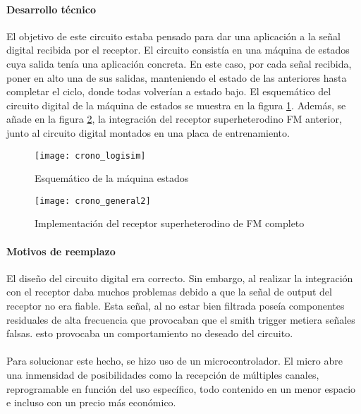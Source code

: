 \paragraph{Desarrollo técnico}
El objetivo de este circuito estaba pensado para dar una aplicaci\'on a la señal digital recibida por el receptor. El circuito consistía en una máquina de estados cuya salida tenía una aplicación concreta. En este caso, por cada señal recibida, poner en alto una de sus salidas, manteniendo el estado de las anteriores hasta completar el ciclo, donde todas volverían a estado bajo. 
El esquemático del circuito digital de la máquina de estados se muestra en la figura \ref{fig:crono_logisim}.
Además, se añade en la figura \ref{fig:crono_general}, la integración del receptor superheterodino FM anterior, junto al circuito digital montados en una placa de entrenamiento.

\begin{figure}[h!]
    \centering
    \texttt{[image: crono\_logisim]}
    \caption{Esquemático de la m\'aquina estados}
    \label{fig:crono_logisim}
\end{figure}

\begin{figure}[h!]
    \centering
    \texttt{[image: crono\_general2]}
    \caption{Implementaci\'on del receptor superheterodino de FM completo}
    \label{fig:crono_general}
\end{figure}

\paragraph{Motivos de reemplazo}
El diseño del circuito digital era correcto. Sin embargo, al realizar la integración con el receptor daba muchos problemas debido a que la señal de output del receptor no era fiable. Esta señal, al no estar bien filtrada poseía componentes residuales de alta frecuencia que provocaban que el smith trigger metiera señales falsas. esto provocaba un comportamiento no deseado del circuito. 
\paragraph{}
Para solucionar este hecho, se hizo uso de un microcontrolador. El micro abre una inmensidad de posibilidades como la recepci\'on de múltiples canales, reprogramable en función del uso específico, todo contenido en un menor espacio e incluso con un precio más económico.
